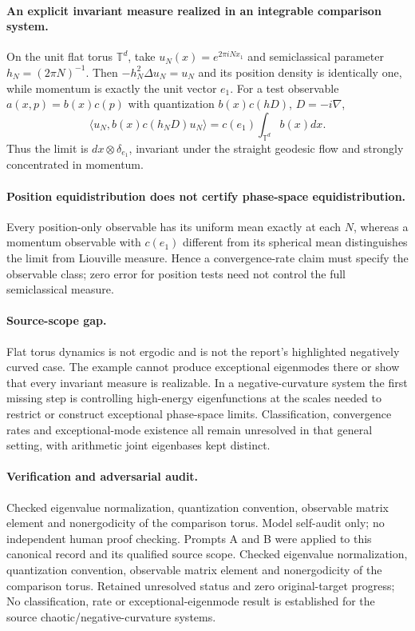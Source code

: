 \documentclass[11pt]{article}
\begin{document}
\paragraph{An explicit invariant measure realized in an integrable comparison system.} On the unit flat torus $\mathbb T^d$, take $u_N(x)=e^{2\pi iNx_1}$ and semiclassical parameter $h_N=(2\pi N)^{-1}$. Then $-h_N^2\Delta u_N=u_N$ and its position density is identically one, while momentum is exactly the unit vector $e_1$. For a test observable $a(x,p)=b(x)c(p)$ with quantization $b(x)c(hD)$, $D=-i\nabla$,
\[
 \langle u_N,b(x)c(h_ND)u_N\rangle=c(e_1)\int_{\mathbb T^d}b(x)dx.
\]
Thus the limit is $dx\otimes\delta_{e_1}$, invariant under the straight geodesic flow and strongly concentrated in momentum.

\paragraph{Position equidistribution does not certify phase-space equidistribution.} Every position-only observable has its uniform mean exactly at each $N$, whereas a momentum observable with $c(e_1)$ different from its spherical mean distinguishes the limit from Liouville measure. Hence a convergence-rate claim must specify the observable class; zero error for position tests need not control the full semiclassical measure.

\paragraph{Source-scope gap.} Flat torus dynamics is not ergodic and is not the report's highlighted negatively curved case. The example cannot produce exceptional eigenmodes there or show that every invariant measure is realizable. In a negative-curvature system the first missing step is controlling high-energy eigenfunctions at the scales needed to restrict or construct exceptional phase-space limits. Classification, convergence rates and exceptional-mode existence all remain unresolved in that general setting, with arithmetic joint eigenbases kept distinct.

\paragraph{Verification and adversarial audit.}
Checked eigenvalue normalization, quantization convention, observable matrix element and nonergodicity of the comparison torus. Model self-audit only; no independent human proof checking. Prompts A and B were applied to this canonical record and its qualified source scope. Checked eigenvalue normalization, quantization convention, observable matrix element and nonergodicity of the comparison torus. Retained unresolved status and zero original-target progress; No classification, rate or exceptional-eigenmode result is established for the source chaotic/negative-curvature systems.
\end{document}
